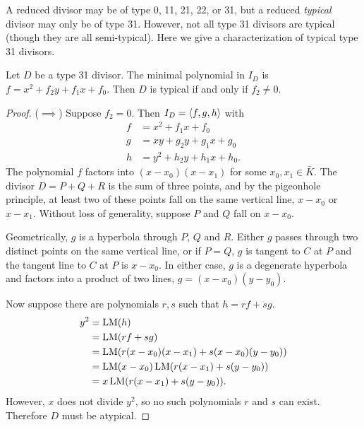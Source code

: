 A reduced divisor may be of type 0, 11, 21, 22, or 31,
but a reduced \emph{typical} divisor may only be of type 31.
However, not all type 31 divisors are typical (though they are all semi-typical).
Here we give a characterization of typical type 31 divisors.
\begin{theorem}
  \label{thm_typical_type_31_divisors}
  Let $D$ be a type 31 divisor.
  The minimal polynomial in $I_D$ is $f = x^2 + f_2y + f_1x + f_0$.
  Then $D$ is typical if and only if $f_2 \neq 0$.
\end{theorem}
\begin{proof}
  ($\implies$)
  Suppose $f_2 = 0$.
  Then $I_D = \left\langle f, g, h \right\rangle$ with
  \begin{align*}
    f &= x^2 + f_1x + f_0 \\
    g &= xy  + g_2y + g_1x + g_0 \\
    h &= y^2 + h_2y + h_1x + h_0.
  \end{align*}
  The polynomial $f$ factors into $(x - x_0)(x - x_1)$ for some $x_0, x_1 \in \bar K$.
  The divisor $D = P + Q + R$ is the sum of three points, and by the pigeonhole principle,
  at least two of these points fall on the same vertical line, $x - x_0$ or $x - x_1$.
  Without loss of generality, suppose $P$ and $Q$ fall on $x - x_0$.
  
  Geometrically, $g$ is a hyperbola through $P$, $Q$ and $R$.
  Either $g$ passes through two distinct points on the same vertical line,
  or if $P = Q$, $g$ is tangent to $C$ at $P$ and the tangent line to $C$ at $P$ is $x - x_0$.
  In either case, $g$ is a degenerate hyperbola and factors into a product of two lines, $g = (x - x_0)(y - y_0)$.
  
  Now suppose there are polynomials $r, s$ such that $h = rf + sg$.
  \begin{align*}
    y^2 &= \operatorname{LM}(h) \\
        &= \operatorname{LM}(rf + sg) \\
        &= \operatorname{LM}(r(x - x_0)(x - x_1) + s(x - x_0)(y - y_0)) \\
        &= \operatorname{LM}(x - x_0)\operatorname{LM}(r(x - x_1) + s(y - y_0)) \\
        &= x\operatorname{LM}(r(x - x_1) + s(y - y_0)).
  \end{align*}
  However, $x$ does not divide $y^2$, so no such polynomials $r$ and $s$ can exist.
  Therefore $D$ must be atypical.
  

\end{proof}
